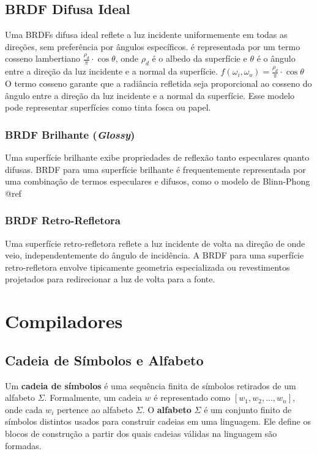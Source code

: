 \documentclass[english, 
               brazil, 
               bsc] %
               {dcomp-abntex2}
\begin{document}
\subsection{BRDF Difusa Ideal}
Uma BRDFs difusa ideal reflete a luz incidente uniformemente em todas as direções, sem preferência por ângulos específicos. é representada por um termo cosseno lambertiano $\frac{\rho_d}{\pi} \cdot \cos \theta$, onde $\rho_d$ é o albedo da superfície e $\theta$ é o ângulo entre a direção da luz incidente e a normal da superfície.
$f(\omega_i, \omega_o) = \frac{\rho_d}{\pi} \cdot \cos \theta$
O termo cosseno garante que a radiância refletida seja proporcional ao cosseno do ângulo entre a direção da luz incidente e a normal da superfície. Esse modelo pode representar superfícies como tinta fosca ou papel.

\subsubsection{BRDF Brilhante (\textit{Glossy})}
Uma superfície brilhante exibe propriedades de reflexão tanto especulares quanto difusas. BRDF para uma superfície brilhante é frequentemente representada por uma combinação de termos especulares e difusos, como o modelo de Blinn-Phong @ref

\subsubsection{BRDF Retro-Refletora}
Uma superfície retro-refletora reflete a luz incidente de volta na direção de onde veio, independentemente do ângulo de incidência. A BRDF para uma superfície retro-refletora envolve tipicamente geometria especializada ou revestimentos projetados para redirecionar a luz de volta para a fonte.

\section{Compiladores}

\subsection{Cadeia de Símbolos e Alfabeto}

Um \textbf{cadeia de símbolos} é uma sequência finita de símbolos retirados de um alfabeto $ \Sigma $. Formalmente, um cadeia $ w $ é representado como $ [w_1, w_2, ..., w_n] $, onde cada $ w_i $ pertence ao alfabeto $ \Sigma $. O \textbf{alfabeto} $ \Sigma $ é um conjunto finito de símbolos distintos usados para construir cadeias em uma linguagem. Ele define os blocos de construção a partir dos quais cadeias válidas na linguagem são formadas.
\end{document}
